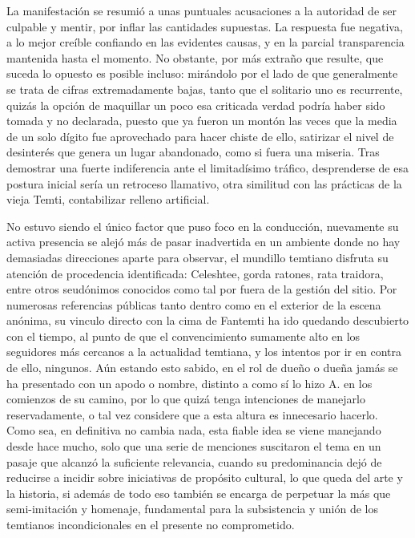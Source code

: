 \documentclass[
]{book}
\begin{document}
La manifestación se resumió a unas puntuales acusaciones a la autoridad de ser culpable y mentir, por inflar las cantidades supuestas. La respuesta fue negativa, a lo mejor creíble confiando en las evidentes causas, y en la parcial transparencia mantenida hasta el momento. No obstante, por más extraño que resulte, que suceda lo opuesto es posible incluso: mirándolo por el lado de que generalmente se trata de cifras extremadamente bajas, tanto que el solitario uno es recurrente, quizás la opción de maquillar un poco esa criticada verdad podría haber sido tomada y no declarada, puesto que ya fueron un montón las veces que la media de un solo dígito fue aprovechado para hacer chiste de ello, satirizar el nivel de desinterés que genera un lugar abandonado, como si fuera una miseria. Tras demostrar una fuerte indiferencia ante el limitadísimo tráfico, desprenderse de esa postura inicial sería un retroceso llamativo, otra similitud con las prácticas de la vieja Temti, contabilizar relleno artificial.

No estuvo siendo el único factor que puso foco en la conducción, nuevamente su activa presencia se alejó más de pasar inadvertida en un ambiente donde no hay demasiadas direcciones aparte para observar, el mundillo temtiano disfruta su atención de procedencia identificada: Celeshtee, gorda ratones, rata traidora, entre otros seudónimos conocidos como tal por fuera de la gestión del sitio. Por numerosas referencias públicas tanto dentro como en el exterior de la escena anónima, su vinculo directo con la cima de Fantemti ha ido quedando descubierto con el tiempo, al punto de que el convencimiento sumamente alto en los seguidores más cercanos a la actualidad temtiana, y los intentos por ir en contra de ello, ningunos. Aún estando esto sabido, en el rol de dueño o dueña jamás se ha presentado con un apodo o nombre, distinto a como sí lo hizo A. en los comienzos de su camino, por lo que quizá tenga intenciones de manejarlo reservadamente, o tal vez considere que a esta altura es innecesario hacerlo. Como sea, en definitiva no cambia nada, esta fiable idea se viene manejando desde hace mucho, solo que una serie de menciones suscitaron el tema en un pasaje que alcanzó la suficiente relevancia, cuando su predominancia dejó de reducirse a incidir sobre iniciativas de propósito cultural, lo que queda del arte y la historia, si además de todo eso también se encarga de perpetuar la más que semi-imitación y homenaje, fundamental para la subsistencia y unión de los temtianos incondicionales en el presente no comprometido.
\end{document}
